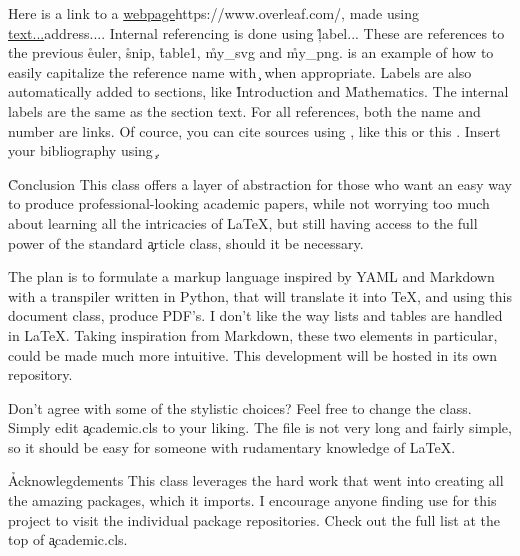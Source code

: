 \documentclass[tome,onecolumn]{lix}
\begin{document}

Here is a link to a \url{webpage}{https://www.overleaf.com/}, made using \c{\url{text...}{address...}}. Internal referencing is done using \c{\r{label...}} These are references to the previous \r{euler}, \r{snip}, \r{table1}, \r{my_svg} and \r{my_png}.  is an example of how to easily capitalize the reference name with \c{} when appropriate. Labels are also automatically added to sections, like \r{Introduction} and \r{Mathematics}. The internal labels are the same as the section text. For all references, both the name and number are links. Of cource, you can cite sources using \c{\cite{...}}, like this \cite{minted} or this \cite{tabularray}. Insert your bibliography using \c{}.

\h{Conclusion}
This class offers a layer of abstraction for those who want an easy way to produce professional-looking academic papers, while not worrying too much about learning all the intricacies of LaTeX, but still having access to the full power of the standard \c{article} class, should it be necessary.

The plan is to formulate a markup language inspired by YAML and Markdown with a transpiler written in Python, that will translate it into TeX, and using this document class, produce PDF's. I don't like the way lists and tables are handled in LaTeX. Taking inspiration from Markdown, these two elements in particular, could be made much more intuitive. This development will be hosted in its own repository.

Don't agree with some of the stylistic choices? Feel free to change the class. Simply edit \c{academic.cls} to your liking. The file is not very long and fairly simple, so it should be easy for someone with rudamentary knowledge of LaTeX.

\h*{Acknowlegdements}
This class leverages the hard work that went into creating all the amazing packages, which it imports. I encourage anyone finding use for this project to visit the individual package repositories. Check out the full list at the top of \c{academic.cls}.
\end{document}
